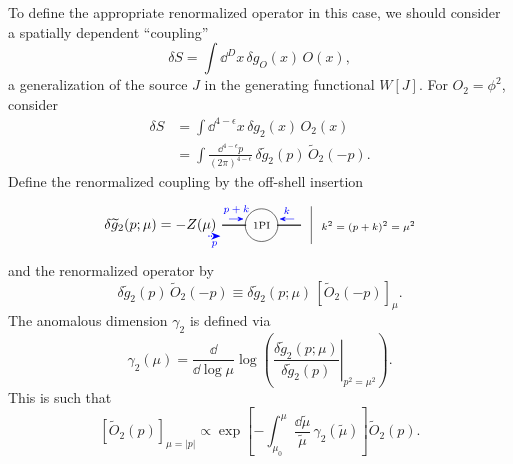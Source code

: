 To define the appropriate renormalized operator in this case, we should
consider a spatially dependent ``coupling''
\[
  \delta S=\int \dd^D x\,\delta g_O(x)\,O(x),
\]
a generalization of the source \(J\) in the generating functional \(W[J]\).
For \(O_2=\phi^2\), consider
\[
\begin{aligned}
  \delta S
  &=
  \int \dd^{4-\epsilon}x\,\delta g_2(x)\,O_2(x)
\\
  &=
  \int\frac{\dd^{4-\epsilon}p}{(2\pi)^{4-\epsilon}}\,
  \delta\widetilde g_2(p)\,\widetilde O_2(-p).
\end{aligned}
\]
Define the renormalized coupling by the off-shell insertion
\[
\begin{tikzpicture}[baseline=(base.base),>=Stealth,scale=0.86]
  \node (base) at (0,-0.2) {};
  \node at (-2.95,0) {\(\delta\widetilde g_2(p;\mu)=-Z(\mu)\)};
  \draw[thick] (-1.15,0) -- (-0.45,0);
  \draw[thick] (0.45,0) -- (1.15,0);
  \node[circle,draw,minimum size=0.82cm,inner sep=1pt] at (0,0) {\scriptsize 1PI};
  \draw[->,blue] (-0.95,0.18) -- (-0.52,0.18) node[midway,above] {\scriptsize \(p+k\)};
  \draw[->,blue] (0.95,0.18) -- (0.52,0.18) node[midway,above] {\scriptsize \(k\)};
  \draw[->,blue,densely dotted,thick] (-1.55,-0.32) -- (-1.2,-0.32)
    node[midway,below] {\scriptsize \(p\)};
  \draw (1.45,-0.55) -- (1.45,0.55);
  \node[right,align=left] at (1.6,-0.05)
    {\scriptsize \(k^2=(p+k)^2=\mu^2\)};
\end{tikzpicture}
\]
and the renormalized operator by
\[
  \delta\widetilde g_2(p)\,\widetilde O_2(-p)
  \equiv
  \delta\widetilde g_2(p;\mu)\,[\widetilde O_2(-p)]_\mu.
\]
The anomalous dimension \(\gamma_2\) is defined via
\[
  \gamma_2(\mu)
  =
  \frac{\dd}{\dd\log\mu}
  \log\left(
    \left.\frac{\delta\widetilde g_2(p;\mu)}
    {\delta\widetilde g_2(p)}\right|_{p^2=\mu^2}
  \right).
\]
This is such that
\[
  [\widetilde O_2(p)]_{\mu=|p|}
  \propto
  \exp\left[
    -\int_{\mu_0}^{\mu}\frac{\dd\widetilde\mu}{\widetilde\mu}\,
    \gamma_2(\widetilde\mu)
  \right]\widetilde O_2(p).
  \tag{*}
\]

